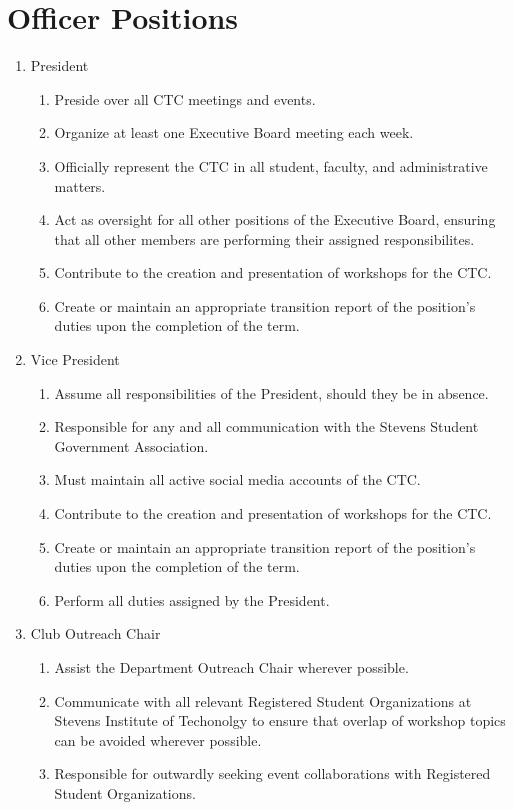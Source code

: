 \documentclass[a4paper,12pt]{article}
\begin{document}
\section{Officer Positions}
\begin{enumerate}
\item President
	\begin{enumerate}
	\item Preside over all CTC meetings and events.
	\item Organize at least one Executive Board meeting each week.
	\item Officially represent the CTC in all student, faculty, and administrative matters.
	\item Act as oversight for all other positions of the Executive Board, ensuring that all other members are performing their assigned responsibilites.
	\item Contribute to the creation and presentation of workshops for the CTC.
	\item Create or maintain an appropriate transition report of the position's duties upon the completion of the term.
	\end{enumerate}
\item Vice President
	\begin{enumerate}
	\item Assume all responsibilities of the President, should they be in absence. 
	\item Responsible for any and all communication with the Stevens Student Government Association.
	\item Must maintain all active social media accounts of the CTC.
	\item Contribute to the creation and presentation of workshops for the CTC.
	\item Create or maintain an appropriate transition report of the position's duties upon the completion of the term.
	\item Perform all duties assigned by the President.
	\end{enumerate}
\item Club Outreach Chair
	\begin{enumerate}
	\item Assist the Department Outreach Chair wherever possible.
	\item Communicate with all relevant Registered Student Organizations at Stevens Institute of Techonolgy to ensure that overlap of workshop topics can be avoided wherever possible.
	\item Responsible for outwardly seeking event collaborations with Registered Student Organizations.

\end{enumerate}
\end{enumerate}
\end{document}
